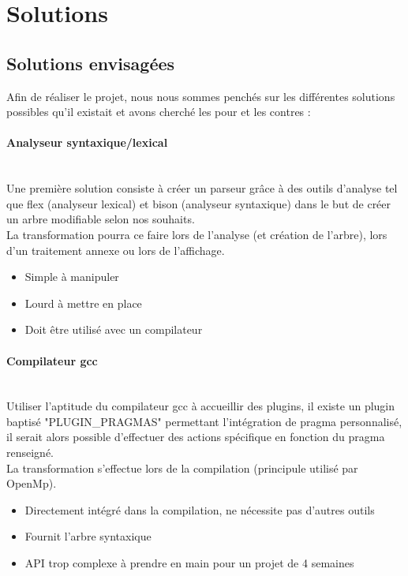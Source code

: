 \documentclass{article}
\begin{document}
	\newpage	
	
	\section{Solutions}
	

	\subsection{Solutions envisagées}
	



	Afin de réaliser le projet, nous nous sommes penchés sur les différentes solutions possibles qu'il existait et avons cherché les pour et les contres :
	
	\paragraph{Analyseur syntaxique/lexical}
	~~\\
	\indent
	Une première solution consiste à créer un parseur grâce à des outils d'analyse tel que flex (analyseur lexical) et bison (analyseur syntaxique) dans le but de créer un arbre modifiable selon nos souhaits.\\
	La transformation pourra ce faire lors de l'analyse (et création de l'arbre), lors d'un traitement annexe ou lors de l'affichage.\\
	\begin{itemize}
		\item Simple à manipuler
		\item Lourd à mettre en place
		\item Doit être utilisé avec un compilateur
	\end{itemize}
	
	\paragraph{Compilateur gcc}
		~~\\
	\indent
	Utiliser l'aptitude du compilateur gcc à accueillir des plugins, il existe un plugin baptisé "PLUGIN\_PRAGMAS" permettant l'intégration de pragma personnalisé, il serait alors possible d'effectuer des actions spécifique en fonction du pragma renseigné.\\ La transformation s'effectue lors de la compilation (principule utilisé par OpenMp). \\
	\begin{itemize}
		\item Directement intégré dans la compilation, ne nécessite pas d'autres outils
		\item Fournit l'arbre syntaxique
		\item API trop complexe à prendre en main pour un projet de 4 semaines
	\end{itemize}
	
\end{document}
